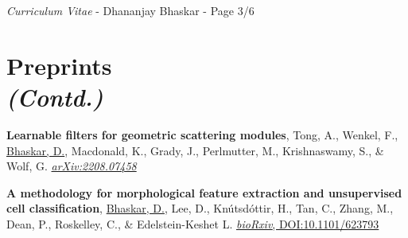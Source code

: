 \documentclass[margin,line]{res}
\begin{document}
\begin{resume}

\newpage
\begin{flushright}
\textit{Curriculum Vitae} - Dhananjay Bhaskar - Page 3/6
\end{flushright}
\vspace*{.02cm}

\section{\sc Preprints\\ \textit{(Contd.)}}
{
\renewcommand\leftmargini{0em}
\renewcommand{\labelenumi}{P\theenumi}
\begin{etaremune}[start=2]
\item{\bf Learnable filters for geometric scattering modules},
Tong, A., Wenkel, F., \underline{Bhaskar, D.}, Macdonald, K., Grady, J., Perlmutter, M., Krishnaswamy, S., \& Wolf, G.
\href{https://arxiv.org/abs/2208.07458}{\textit{arXiv:2208.07458}}
\item{\bf A methodology for morphological feature extraction and unsupervised cell classification},
\underline{Bhaskar, D.}, Lee, D., Kn\'{u}tsd\'{o}ttir, H., Tan, C., Zhang, M., Dean, P., Roskelley, C., \& Edelstein-Keshet L.
\href{https://www.biorxiv.org/content/10.1101/623793v1.abstract}{\textit{bioRxiv}, DOI:10.1101/623793}
\end{etaremune}
}


\end{resume}
\end{document}
